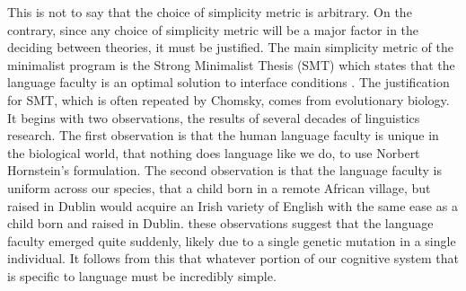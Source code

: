 \documentclass[MilwayThesis]{subfiles}
\begin{document}
This is not to say that the choice of simplicity metric is arbitrary.
On the contrary, since any choice of simplicity metric will be a major factor in the deciding between theories, it must be justified.
The main simplicity metric of the minimalist program is the Strong Minimalist Thesis (SMT) which states that the language faculty is an optimal solution to interface conditions \parencite{chomsky2001derivation}.
The justification for SMT, which is often repeated by Chomsky, comes from evolutionary biology.
It begins with two observations, the results of several decades of linguistics research.
The first observation is that the human language faculty is unique in the biological world, that nothing does language like we do, to use Norbert Hornstein's formulation.
The second observation is that the language faculty is uniform across our species, that a child born in a remote African village, but raised in Dublin would acquire an Irish variety of English with the same ease as a child born and raised in Dublin.
these observations suggest that the language faculty emerged quite suddenly, likely due to a single genetic mutation in a single individual.
It follows from this that whatever portion of our cognitive system that is specific to language must be incredibly simple.
\end{document}
